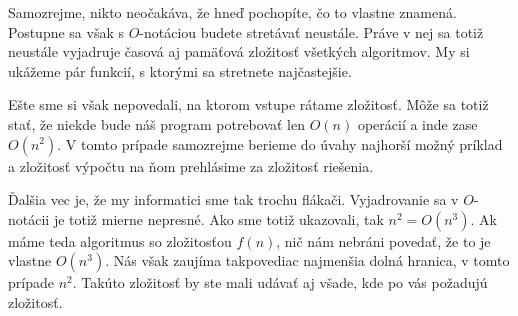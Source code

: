 
Samozrejme, nikto neočakáva, že hneď pochopíte, čo to vlastne znamená. Postupne sa však s
$O$-notáciou budete stretávať neustále. Práve v nej sa totiž neustále vyjadruje časová aj pamäťová
zložitosť všetkých algoritmov. My si ukážeme pár funkcií, s ktorými sa stretnete najčastejšie.

Ešte sme si však nepovedali, na ktorom vstupe rátame zložitosť. Môže sa totiž stať, že niekde bude
náš program potrebovať len $O(n)$ operácií a inde zase $O(n^2)$. V tomto prípade samozrejme berieme do úvahy
najhorší možný príklad a zložitosť výpočtu na ňom prehlásime za zložitosť riešenia.

Ďalšia vec je, že my informatici sme tak trochu flákači. Vyjadrovanie sa v $O$-notácii je totiž
mierne nepresné. Ako sme totiž ukazovali, tak $n^2 = O(n^3)$. Ak máme teda algoritmus so zložitosťou
$f(n)$, nič nám nebráni povedať, že to je vlastne $O(n^3)$. Nás však zaujíma takpovediac najmenšia
dolná hranica, v tomto prípade $n^2$. Takúto zložitosť by ste mali udávať aj všade, kde po vás
požadujú zložitosť.



